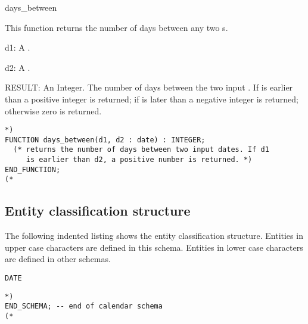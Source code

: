 \documentclass{article}
\begin{document}
\begin{Mnamedesc}{days_between}

\begin{Mdesctext}

This function returns the number of days between any two s.

\end{Mdesctext}

\begin{Ipars}

\item[d1:] A .

\item[d2:] A .

\item[RESULT:] An Integer. The number of days between the two input
. If  is earlier than  a positive integer is
returned; if  is later than  a negative integer is returned;
otherwise zero is returned.

\end{Ipars}

\begin{Mexp}
\begin{verbatim}
*)
FUNCTION days_between(d1, d2 : date) : INTEGER;
  (* returns the number of days between two input dates. If d1 
     is earlier than d2, a positive number is returned. *) 
END_FUNCTION;
(*
\end{verbatim}
\end{Mexp}
\end{Mnamedesc}

\subsection{Entity classification structure}

The following indented listing shows the entity classification structure.
Entities in upper case characters are defined in this schema. Entities in
lower case characters are defined in other schemas.

\begin{small} 
\begin{verbatim}
DATE
\end{verbatim} 
\end{small}

\begin{small} 
\begin{verbatim}
*)
END_SCHEMA; -- end of calendar schema
(*
\end{verbatim} 
\end{small}
\end{document}
